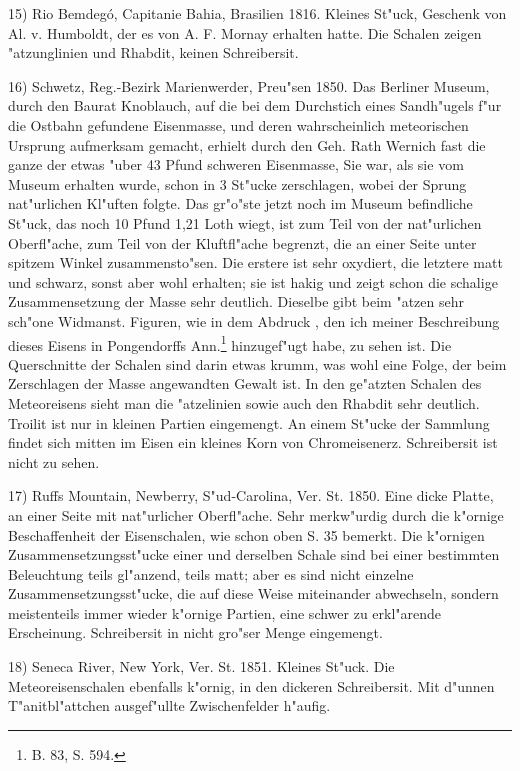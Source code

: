 \documentclass[a4paper, 11pt, oneside, german]{article}
\begin{document}
15) Rio Bemdegó, Capitanie Bahia, Brasilien 1816. Kleines St"uck, Geschenk von Al. v. Humboldt, der es von A. F. Mornay erhalten hatte. Die Schalen zeigen "atzunglinien und Rhabdit, keinen Schreibersit.

16) Schwetz, Reg.-Bezirk Marienwerder, Preu"sen 1850. Das Berliner Museum, durch den Baurat Knoblauch, auf die bei dem Durchstich eines Sandh"ugels f"ur die Ostbahn gefundene Eisenmasse, und deren wahrscheinlich meteorischen Ursprung aufmerksam gemacht, erhielt durch den Geh. Rath Wernich fast die ganze der etwas "uber 43 Pfund schweren Eisenmasse, Sie war, als sie vom Museum erhalten wurde, schon in 3 St"ucke zerschlagen, wobei der Sprung nat"urlichen Kl"uften folgte. Das gr"o"ste jetzt noch im Museum befindliche St"uck, das noch 10 Pfund 1,21 Loth wiegt, ist zum Teil von der nat"urlichen Oberfl"ache, zum Teil von der Kluftfl"ache begrenzt, die an einer Seite unter spitzem Winkel zusammensto"sen. Die erstere ist sehr oxydiert, die letztere matt und schwarz, sonst aber wohl erhalten; sie ist hakig und zeigt schon die schalige Zusammensetzung der Masse sehr deutlich. Dieselbe gibt beim "atzen sehr sch"one Widmanst. Figuren, wie in dem Abdruck , den ich meiner Beschreibung dieses Eisens in Pongendorffs Ann.\footnote{B. 83, S. 594.} hinzugef"ugt habe, zu sehen ist. Die Querschnitte der Schalen sind darin etwas krumm, was wohl eine Folge, der beim Zerschlagen der Masse angewandten Gewalt ist. In den ge"atzten Schalen des Meteoreisens sieht man die "atzelinien sowie auch den Rhabdit sehr deutlich. Troilit ist nur in kleinen Partien eingemengt. An einem St"ucke der Sammlung findet sich mitten im Eisen ein kleines Korn von Chromeisenerz. Schreibersit ist nicht zu sehen.

17) Ruffs Mountain, Newberry, S"ud-Carolina, Ver. St. 1850. Eine dicke Platte, an einer Seite mit nat"urlicher Oberfl"ache. Sehr merkw"urdig durch die k"ornige Beschaffenheit der Eisenschalen, wie schon oben S. 35 bemerkt. Die k"ornigen Zusammensetzungsst"ucke einer und derselben Schale sind bei einer bestimmten Beleuchtung teils gl"anzend, teils matt; aber es sind nicht einzelne Zusammensetzungsst"ucke, die auf diese Weise miteinander abwechseln, sondern meistenteils immer wieder k"ornige Partien, eine schwer zu erkl"arende Erscheinung. Schreibersit in nicht gro"ser Menge eingemengt.

18) Seneca River, New York, Ver. St. 1851. Kleines St"uck. Die Meteoreisenschalen ebenfalls k"ornig, in den dickeren Schreibersit. Mit d"unnen T"anitbl"attchen ausgef"ullte Zwischenfelder h"aufig.
\end{document}
